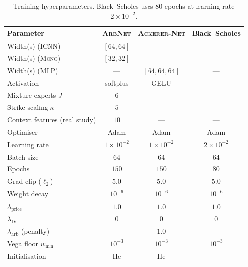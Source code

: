 \documentclass[largeformat]{interact}
\let\cite\citep   %
\theoremstyle{plain}
\theoremstyle{definition}
\newcommand{\arbnet}{\textsc{ArbNet}}
\newcommand{\ackerer}{\textsc{Ackerer-Net}}
\newcommand{\icnn}{\textsc{ICNN}}
\newcommand{\mononet}{\textsc{Mono}}
\newcommand{\bs}{Black--Scholes}
\begin{document}
\begin{table}[h]
\centering
\caption{Training hyperparameters. \bs{} uses $80$ epochs at learning rate $2\!\times\!10^{-2}$.}
\label{tab:hyperparams}
\begin{tabular}{lccc}
\toprule
Parameter & \arbnet{} & \ackerer{} & \bs{} \\
\midrule
Width(s) (\icnn) & $[64, 64]$ & --- & --- \\
Width(s) (\mononet) & $[32, 32]$ & --- & --- \\
Width(s) (MLP) & --- & $[64, 64, 64]$ & --- \\
Activation & softplus & GELU & --- \\
Mixture experts $J$ & $6$ & --- & --- \\
Strike scaling $\kappa$ & $5$ & --- & --- \\
Context features (real study) & $10$ & --- & --- \\
Optimiser & Adam & Adam & Adam \\
Learning rate & $1{\times}10^{-2}$ & $1{\times}10^{-2}$ & $2{\times}10^{-2}$ \\
Batch size & $64$ & $64$ & $64$ \\
Epochs & $150$ & $150$ & $80$ \\
Grad clip ($\ell_2$) & $5.0$ & $5.0$ & $5.0$ \\
Weight decay & $10^{-6}$ & $10^{-6}$ & $10^{-6}$ \\
$\lambda_{\mathrm{price}}$ & $1.0$ & $1.0$ & $1.0$ \\
$\lambda_{\mathrm{IV}}$ & $0$ & $0$ & $0$ \\
$\lambda_{\mathrm{arb}}$ (penalty) & --- & $1.0$ & --- \\
Vega floor $w_{\min}$ & $10^{-3}$ & $10^{-3}$ & $10^{-3}$ \\
Initialisation & He \cite{he2015delving} & He \cite{he2015delving} & --- \\
\bottomrule
\end{tabular}
\end{table}



\end{document}
